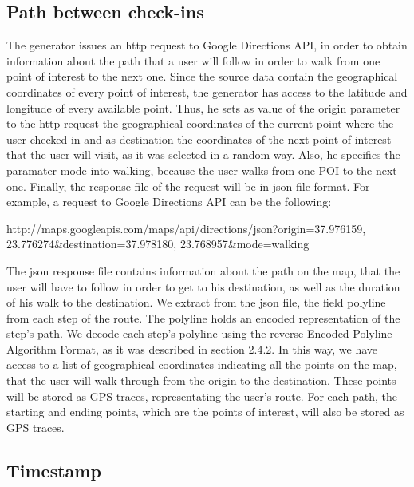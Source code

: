 \subsection{Path between check-ins}

The generator issues an http request to Google Directions API, in order to obtain information about the path that a user will follow in order to walk from one point 
of interest to the next one. Since the source data contain the geographical coordinates of every point of interest, the generator has access to the latitude and 
longitude of every available point. Thus, he sets as value of the origin parameter to the http request the geographical coordinates of the current point where 
the user checked in and as destination the coordinates of the next point of interest that the user will visit, as it was selected in a random way. Also, he 
specifies the paramater mode into walking, because the user walks from one POI to the next one. Finally, the response file of the request will be in json file format. 
For example, a request to Google Directions API can be the following:
\begin{center}
 http://maps.googleapis.com/maps/api/directions/json?origin=37.976159, 23.776274\&destination=37.978180, 23.768957\&mode=walking
\end{center}

The json response file contains information about the path on the map, that the user will have to follow in order to get to his destination, as well as the duration of 
his walk to the destination. We extract from the json file, the field polyline from each step of the route. The polyline holds an encoded representation of the step's 
path. We decode each step's polyline using the reverse Encoded Polyline Algorithm Format, as it was described in section 2.4.2. In this way, we have access 
to a list of geographical coordinates indicating all the points on the map, that the user will walk through from the origin to the destination. These points 
will be stored as GPS traces, representating the user's route. For each path, the starting and ending points, which are the points of interest, will also be stored 
as GPS traces.

\subsection{Timestamp}

